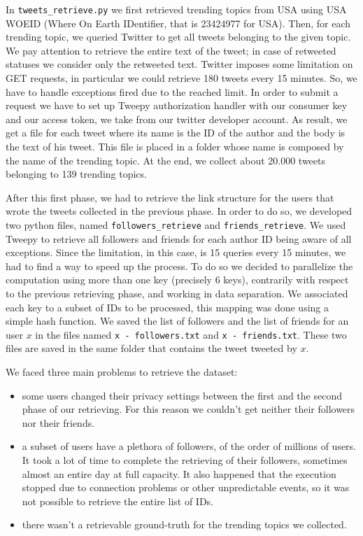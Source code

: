 \documentclass[journal,11pt]{vgtc}
\begin{document}
In \texttt{tweets\_retrieve.py} we
first retrieved trending topics from USA using USA WOEID (Where On Earth IDentifier, that is 23424977 for USA). 
Then, for each trending topic, we queried Twitter to get all tweets belonging to the given topic.
We pay attention to retrieve the entire text of the tweet; in case of retweeted statuses we consider only the 
retweeted text. 
Twitter imposes some limitation on GET requests, in particular we could retrieve 180 tweets every 15 minutes.
So, we have to handle exceptions fired due to the reached limit.
In order to submit a request we have to set up Tweepy authorization handler with our
consumer key and our access token, we take from our twitter developer account.
As result, we get a file for each tweet where its name is the ID of the author and the body is the text of his tweet.
This file is placed in a folder whose name is composed by the name of the trending topic.
At the end, we collect about 20.000 tweets belonging to 139 trending topics.

After this first phase, we had to retrieve the link structure for the users that wrote the tweets collected 
in the previous phase. In order to do so, we developed two python files, named \texttt{followers\_retrieve} and 
\texttt{friends\_retrieve}. 
We used Tweepy to retrieve all followers and friends for each author ID being aware of all exceptions.
Since the limitation, in this case, is 15 queries every 15 minutes, we had to find a way to speed up the process.
To do so we decided to parallelize the computation using more than one key (precisely 6 keys), contrarily with respect to the previous 
retrieving phase, and working in data separation. We associated each key to a subset of IDs to be processed, this
mapping was done using a simple hash function. 
We saved the list of followers and the list of friends for an user $x$ in the files named \texttt{x - followers.txt}
and \texttt{x - friends.txt}. These two files are saved in the same folder that contains the tweet tweeted by $x$.

We faced three main problems to retrieve the dataset:
\begin{itemize}
  \item some users changed their privacy settings between the first and the second phase
  of our retrieving. For this reason we couldn't get neither their followers nor their friends.
  \item a subset of users have a plethora of followers, of the order of millions of users. 
  It took a lot of time to complete the retrieving of their followers, sometimes almost an 
  entire day at full capacity.
  It also happened that the execution stopped due to connection problems or other unpredictable events, 
  so it was not possible to retrieve the entire list of IDs.
  \item there wasn't a retrievable ground-truth for the trending topics we collected.
\end{itemize}
\end{document}
